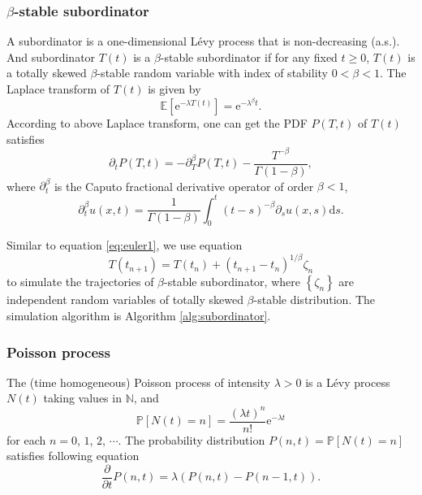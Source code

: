 \documentclass[aps, pre, preprint, amsmath, amssymb]{revtex4}
\newcommand{\e}{\mathrm{e}}
\newcommand{\N}{\mathbb{N}}
\newcommand{\E}{\mathbb{E}}
\renewcommand{\d}{\mathrm{d}}
\renewcommand{\P}{\mathbb{P}}
\newcommand{\xiaokuo}[1]{\left(#1\right)}
\newcommand{\zhongkuo}[1]{\left[#1\right]}
\newcommand{\dakuo}[1]{\left\{#1\right\}}
\begin{document}
\subsubsection{$\beta$-stable subordinator}
A subordinator \cite{applebaum2009levy,ken1999levy} is a one-dimensional L\'{e}vy process that is non-decreasing (a.s.). 
And subordinator $T(t)$ is a $\beta$-stable subordinator if for any fixed $t\geqslant 0$, $T(t)$ is a totally skewed $\beta$-stable random variable with index of stability $0<\beta<1$. 
The Laplace transform of $T(t)$ is given by \cite{applebaum2009levy}
\begin{equation}
\E\zhongkuo{\e^{-\lambda T(t)}}=\e^{-\lambda^{\beta}t}.
\end{equation}
According to above Laplace transform, one can get the PDF $P(T, t)$ of $T(t)$ satisfies
\begin{equation}
{\partial_t}P(T, t)=-\partial_T^{\beta}P(T, t)-\frac{T^{-\beta}}{\Gamma(1-\beta)},
\end{equation}
where $\partial_t^{\beta}$ is the Caputo fractional derivative operator \cite{bleanu2019handbook,pozrikidis2018fractional} of order $\beta<1$,
\begin{equation}
\partial_t^{\beta}u(x,t)=\frac{1}{\Gamma(1-\beta)}\int_0^t(t-s)^{-\beta}\partial_s u(x, s)\d s.
\end{equation}

Similar to equation \eqref{eq:euler1}, we use equation 
\begin{equation}\label{eq:euler2}
T(t_{n+1})=T(t_n)+(t_{n+1}-t_n)^{1/\beta}\zeta_n 
\end{equation}
to simulate the trajectories of $\beta$-stable subordinator, where $\dakuo{\zeta_n}$ are independent random variables of totally skewed $\beta$-stable distribution. The simulation algorithm is Algorithm \ref{alg:subordinator}.

\subsubsection{Poisson process}
The (time homogeneous) Poisson process of intensity $\lambda >0$ is a L\'{e}vy process $N(t)$ taking values in $\N$, and
\begin{equation}
	\P\zhongkuo{N(t)=n}=\frac{(\lambda t)^n}{n!}\e^{-\lambda t}
\end{equation}
for each $n=0$, $1$, $2$, $\cdots$. 
The probability distribution $P(n, t)=\P\zhongkuo{N(t)=n}$ satisfies following equation
\begin{equation}
\frac{\partial}{\partial t}P(n, t)=\lambda\xiaokuo{P(n,t)-P(n-1,t)}.
\end{equation}
\end{document}

